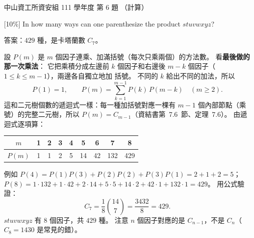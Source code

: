 \begin{pastexam}[label={px:nsysu-111-dmalg-04}]{中山資工所資安組 111 學年度 第 6 題}
（計算）

{[10\%]} In how many ways can one parenthesize the product $stuvwxyz$?
\end{pastexam}

\begin{pastsoln}
答案：$429$ 種，是卡塔蘭數 $C_7$。

設 $P(m)$ 是 $m$ 個因子連乘、加滿括號（每次只乘兩個）的方法數。 看\textbf{最後做的那一次乘法}：
它把乘積分成左邊前 $k$ 個因子和右邊後 $m - k$ 個因子（$1 \le k \le m - 1$），兩邊各自獨立地加
括號。 不同的 $k$ 給出不同的加法，所以
\[
P(1) = 1, \qquad P(m) = \sum_{k=1}^{m-1} P(k)\, P(m - k) \quad (m \ge 2).
\]
這和二元樹個數的遞迴式一樣：每一種加括號對應一棵有 $m - 1$ 個內部節點（乘號）的完整二元樹，所以
$P(m) = C_{m-1}$（資結書第~7.6~節、定理~7.6）。 由遞迴式逐項算：
\begin{center}
\begin{tabular}{c|cccccccc}
$m$ & 1 & 2 & 3 & 4 & 5 & 6 & 7 & 8 \\ \hline
$P(m)$ & 1 & 1 & 2 & 5 & 14 & 42 & 132 & 429 \\
\end{tabular}
\end{center}
例如 $P(4) = P(1)P(3) + P(2)P(2) + P(3)P(1) = 2 + 1 + 2 = 5$；
$P(8) = 1 \cdot 132 + 1 \cdot 42 + 2 \cdot 14 + 5 \cdot 5 + 14 \cdot 2 + 42 \cdot 1 + 132 \cdot 1
= 429$。 用公式驗證：
\[
C_7 = \frac{1}{8}\binom{14}{7} = \frac{3432}{8} = 429 .
\]
$stuvwxyz$ 有 $8$ 個因子，共 $429$ 種。 注意 $n$ 個因子對應的是 $C_{n-1}$，不是 $C_n$（$C_8 = 1430$
是常見的錯）。
\end{pastsoln}
